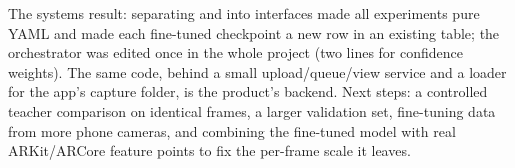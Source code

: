 The systems result: separating  and  into interfaces made all experiments pure YAML
and made each fine-tuned checkpoint a new row in an existing table; the orchestrator was edited once in the whole project
(two lines for confidence weights). The same code, behind a small upload/queue/view service and a loader for the app's
capture folder, is the product's backend. Next steps: a controlled teacher comparison on identical frames, a larger
validation set, fine-tuning data from more phone cameras, and combining the fine-tuned model with real ARKit/ARCore
feature points to fix the per-frame scale it leaves.
